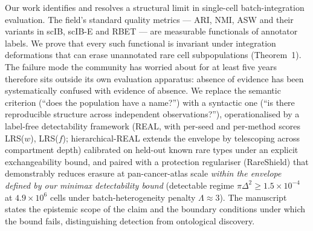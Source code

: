 
Our work identifies and resolves a structural limit in single-cell batch-integration evaluation. The field's standard quality metrics --- ARI, NMI, ASW and their variants in scIB, scIB-E and RBET --- are measurable functionals of annotator labels. We prove that every such functional is invariant under integration deformations that can erase unannotated rare cell subpopulations (Theorem~1). The failure mode the community has worried about for at least five years therefore sits outside its own evaluation apparatus: absence of evidence has been systematically confused with evidence of absence. We replace the semantic criterion (``does the population have a name?'') with a syntactic one (``is there reproducible structure across independent observations?''), operationalised by a label-free detectability framework (REAL, with per-seed and per-method scores LRS($w$), LRS($f$); hierarchical-REAL extends the envelope by telescoping across compartment depth) calibrated on held-out known rare types under an explicit exchangeability bound, and paired with a protection regulariser (RareShield) that demonstrably reduces erasure at pan-cancer-atlas scale \emph{within the envelope defined by our minimax detectability bound} (detectable regime $\pi\Delta^{2}\geq 1.5\times 10^{-4}$ at $4.9\times 10^{6}$ cells under batch-heterogeneity penalty $\Lambda\approx 3$). The manuscript states the epistemic scope of the claim and the boundary conditions under which the bound fails, distinguishing detection from ontological discovery.
